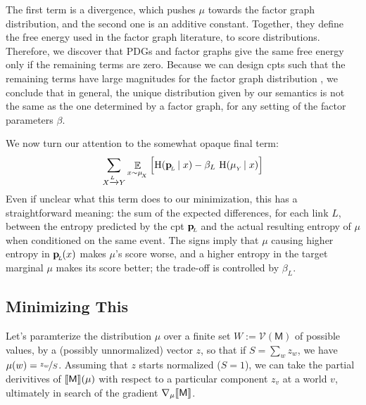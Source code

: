 \documentclass{article}
\newcommand{\bp}[1][L]{\mat{p}_{\!_#1\!}}
\newcommand{\V}{\mathcal V}
\newcommand{\sfM}{\mathsf M}
\newcommand{\alle}[1][L]{_{ X \xrightarrow{\!\!#1} Y }}
\begin{document}
	
	The first term is a divergence, which pushes $\mu$ towards the factor graph distribution, and the second one is an additive constant. Together, they define the free energy used in the factor graph literature, to score distributions. Therefore, we discover that PDGs and factor graphs give the same free energy only if the remaining terms are zero. Because we can design cpts such that the remaining terms have large magnitudes for the factor graph distribution , we conclude that in general, the unique distribution given by our semantics is not the same as the one determined by a factor graph, for any setting of the factor parameters $\beta$. 
	
	
	We now turn our attention to the somewhat opaque final term:
	\[ \sum\alle \E_{x \sim \mu_{\!_X}} \Big[ \H(\bp \mid x) - \beta_L \ \H(\mu_{_Y}\! \mid x) \Big] 
	  \]
	Even if unclear what this term does to our minimization, this has a straightforward meaning: the sum of the expected differences, for each link $L$, between the entropy predicted by the cpt $\bp$ and the actual resulting entropy of $\mu$ when conditioned on the same event.
	The signs imply that $\mu$ causing higher entropy in $\bp(x)$ makes $\mu$'s score worse, and a higher entropy in the target marginal $\mu$ makes its score better; the trade-off is controlled by $\beta_L$.
	
	\subsection{Minimizing This}
	\begingroup\color{gray!50!black}
	
	\def\pz#1{\frac{\partial}{\partial z_v\!}\left[\vphantom{\Big|}#1\right]}
	Let's paramterize the distribution $\mu$ over a finite set $W := \V(\sfM)$ of possible values, by a (possibly unnormalized) vector $z$, so that if $S = \sum_{w} z_w$, we have $\mu(w) = \nicefrac{z_w}{S}$. Assuming that $z$ starts normalized ($S = 1$), we can take the partial derivitives of $\bbr{\sfM}(\mu)$ with respect to a particular component $z_v$ at a world $v$, ultimately in search of the gradient $\nabla_{\mu} \bbr{\sfM}$.
		
\end{document}
